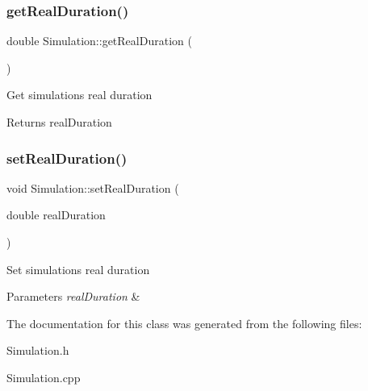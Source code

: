 \subsubsection{\texorpdfstring{get\+Real\+Duration()}{getRealDuration()}}
{\footnotesize\ttfamily double Simulation\+::get\+Real\+Duration (\begin{DoxyParamCaption}{ }\end{DoxyParamCaption})}

Get simulation\textquotesingle{}s real duration \begin{DoxyReturn}{Returns}
real\+Duration 
\end{DoxyReturn}
\mbox{\label{classSimulation_af7d8147539e8ea62f83c44fa0431e27d}} 
\subsubsection{\texorpdfstring{set\+Real\+Duration()}{setRealDuration()}}
{\footnotesize\ttfamily void Simulation\+::set\+Real\+Duration (\begin{DoxyParamCaption}\item[{double}]{real\+Duration }\end{DoxyParamCaption})}

Set simulation\textquotesingle{}s real duration 
\begin{DoxyParams}{Parameters}
{\em real\+Duration} & \\
\hline
\end{DoxyParams}


The documentation for this class was generated from the following files\+:\begin{DoxyCompactItemize}
\item 
Simulation.\+h\item 
Simulation.\+cpp\end{DoxyCompactItemize}
